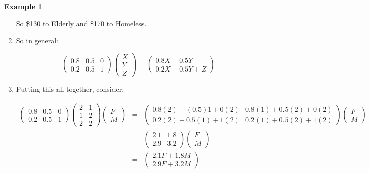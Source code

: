 \documentclass[10pt]{article}
\theoremstyle{definition}
\newtheorem{example}[equation]{Example}
\newcommand{\Z}[1]{\mathbb{Z}^{#1}}
\begin{document}
\begin{example}
\begin{enumerate}
So \$130 to Elderly and \$170 to Homeless.

\item So in general:

$$\begin{pmatrix} 0.8 & 0.5 & 0 \\ 0.2 & 0.5 & 1 \end{pmatrix}\begin{pmatrix}  X\\Y\\Z \end{pmatrix}= \begin{pmatrix} 0.8X+0.5Y \\ 0.2X+0.5Y+Z\end{pmatrix}$$

\item Putting this all together, consider:

\begin{eqnarray*}
\begin{pmatrix} 0.8 & 0.5 & 0 \\ 0.2 & 0.5 & 1 \end{pmatrix} \begin{pmatrix} 2 & 1 \\ 1 & 2 \\ 2 & 2\end{pmatrix} \begin{pmatrix} F\\M \end{pmatrix}&=&\begin{pmatrix} 0.8(2)+(0.5)1+0(2) & 0.8(1)+0.5(2)+0(2) \\ 0.2(2)+0.5(1)+1(2) & 0.2(1)+0.5(2)+1(2) \end{pmatrix}\begin{pmatrix} F\\M \end{pmatrix}\\
&=&\begin{pmatrix} 2.1 & 1.8 \\ 2.9 & 3.2\end{pmatrix}\begin{pmatrix} F\\M \end{pmatrix}\\
&=&\begin{pmatrix} 2.1F + 1.8M \\ 2.9F + 3.2M\end{pmatrix}
\end{eqnarray*}

\end{enumerate}
\end{example}
\end{document}
